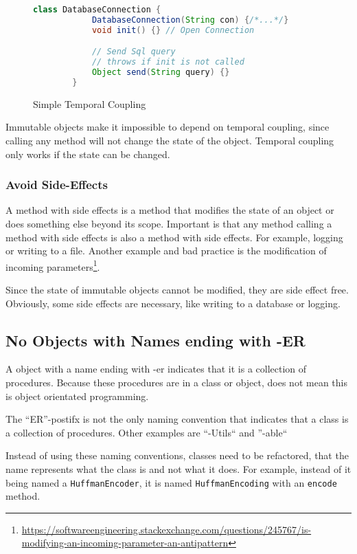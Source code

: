 \begin{figure}[h]
    \caption{Simple Temporal Coupling}
    \begin{lstlisting}[language=Java,basicstyle=\tiny,label={lst:temporal-coupling}]
        class DatabaseConnection {
            DatabaseConnection(String con) {/*...*/}
            void init() {} // Open Connection

            // Send Sql query
            // throws if init is not called
            Object send(String query) {}
        }
    \end{lstlisting}
    \label{fig:temporal-coupling}
\end{figure}

Immutable objects make it impossible to depend on temporal coupling, since calling any method will not change the state of the object.
Temporal coupling only works if the state can be changed.

\subsubsection{Avoid Side-Effects}
A method with side effects is a method that modifies the state of an object or does something else beyond its scope.
Important is that any method calling a method with side effects is also a method with side effects.
For example, logging or writing to a file.
Another example and bad practice is the modification of incoming parameters\footnote{\url{https://softwareengineering.stackexchange.com/questions/245767/is-modifying-an-incoming-parameter-an-antipattern}}.

Since the state of immutable objects cannot be modified, they are side effect free.
Obviously, some side effects are necessary, like writing to a database or logging.

\subsection{No Objects with Names ending with -ER}\label{subsec:no-objects-with-names-ending-with--er}
A object with a name ending with -er indicates that it is a collection of procedures.
Because these procedures are in a class or object, does not mean this is object orientated programming.

The ``ER''-postifx is not the only naming convention that indicates that a class is a collection of procedures.
Other examples are ``-Utils`` and ''-able``

Instead of using these naming conventions, classes need to be refactored, that the name represents what the class is and not what it does.
For example, instead of it being named a \texttt{HuffmanEncoder}, it is named \texttt{HuffmanEncoding} with an \texttt{encode} method.\cite{er-postfix}

